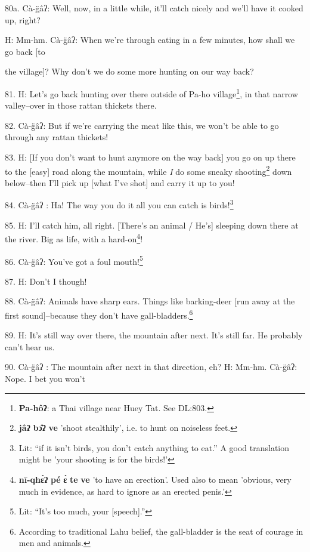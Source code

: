 
80a. Cà-g̈âʔ: Well, now, in a little while, it'll catch nicely and we'll have
it cooked up, right?

H: Mm-hm. Cà-g̈âʔ: When we're through eating in a few minutes, how shall we
go back [to

the village]? Why don't we do some more hunting on our way back?

81. H: Let's go back hunting over there outside of Pa-ho village\footnote{\textbf{Pa-hôʔ}: a Thai village near Huey Tat. See DL:803.}, in that narrow
valley--over in those rattan thickets there.

82. Cà-g̈âʔ: But if we're carrying the meat like this, we won't be able to
go through any rattan thickets!

83. H: [If you don't want to hunt anymore on the way back] you go on up there to
the [easy] road along the mountain, while \textit{I} do some sneaky shooting\footnote{\textbf{jâʔ} \textbf{bɔ̂ʔ} \textbf{ve} 'shoot stealthily', i.e. to hunt on noiseless feet.}
down below--then I'll pick up [what I've shot] and carry it up to you!

84. Cà-g̈âʔ : Ha! The way you do it all you can catch is birds!\footnote{Lit: ``if it isn't birds, you don't catch anything to eat.'' A good translation might be 'your shooting is for the birds!'}

85. H: I'll catch him, all right. [There's an animal / He's] sleeping down there
at the river. Big as life, with a hard-on\footnote{\textbf{nī-qhɛ̀ʔ} \textbf{pé} \textbf{ɛ̀} \textbf{te} \textbf{ve} 'to have an erection'. Used also to mean 'obvious, very much in evidence, as hard to ignore as an erected penis.'}!


86. Cà-g̈âʔ: You've got a foul mouth!\footnote{Lit: ``It's too much, your [speech].''}

87. H: Don't I though!

88. Cà-g̈âʔ: Animals have sharp ears. Things like barking-deer [run away at
the first sound]--because they don't have gall-bladders.\footnote{According to traditional Lahu belief, the gall-bladder is the seat of courage in men and animals.}

89. H: It's still way over there, the mountain after next. It's still far. He probably
can't hear us.

90. Cà-g̈âʔ : The mountain after next in that direction, eh? H: Mm-hm. Cà-g̈âʔ:
Nope. I bet you won't

